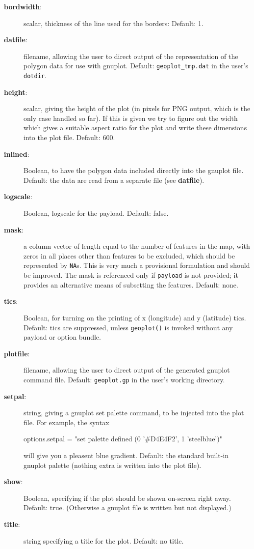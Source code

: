\documentclass{article}
\begin{document}
\begin{description}
\item[\textbf{bordwidth}:] scalar, thickness of the line used for the
  borders: Default: 1.
\item[\textbf{datfile}:] filename, allowing the user to direct output
  of the representation of the polygon data for use with
  gnuplot. Default: \texttt{geoplot\_tmp.dat} in the user’s
  \texttt{dotdir}.
\item[\textbf{height}:] scalar, giving the height of the plot (in
  pixels for PNG output, which is the only case handled so far). If
  this is given we try to figure out the width which gives a suitable
  aspect ratio for the plot and write these dimensions into the plot
  file. Default: 600.
\item[\textbf{inlined}:] Boolean, to have the polygon data included
  directly into the gnuplot file. Default: the data are read from a
  separate file (see \textbf{datfile}).
\item[\textbf{logscale}:] Boolean, logscale for the payload. Default: false.
\item[\textbf{mask}:] a column vector of length equal to the number of
  features in the map, with zeros in all places other than features to
  be excluded, which should be represented by \texttt{NA}s. This is
  very much a provisional formulation and should be improved. The mask
  is referenced only if \texttt{payload} is not provided; it provides
  an alternative means of subsetting the features. Default: none.
\item[\textbf{tics}:] Boolean, for turning on the printing of x
  (longitude) and y (latitude) tics. Default: tics are suppressed,
  unless \texttt{geoplot()} is invoked without any payload or option
  bundle.
\item[\textbf{plotfile}:] filename, allowing the user to direct output
  of the generated gnuplot command file. Default: \texttt{geoplot.gp}
  in the user’s working directory.
\item[\textbf{setpal}:] string, giving a gnuplot set palette command,
  to be injected into the plot file. For example, the syntax
  \begin{code}
    options.setpal = "set palette defined (0 '#D4E4F2', 1 'steelblue')"  
  \end{code}
  will give you a pleasent blue gradient.  Default: the standard
  built-in gnuplot palette (nothing extra is written into the plot
  file).
\item[\textbf{show}:] Boolean, specifying if the plot should be shown
  on-screen right away. Default: true. (Otherwise a gnuplot file is
  written but not displayed.)
\item[\textbf{title}:] string specifying a title for the
  plot. Default: no title.
\end{description}
\end{document}
